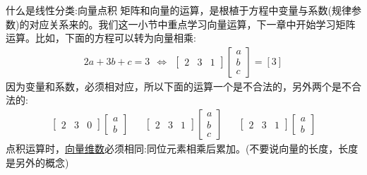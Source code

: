 \documentclass[handout]{ctexbeamer}
\begin{document}
\begin{frame}{什么是线性分类:向量点积}
矩阵和向量的运算，是根植于方程中变量与系数(规律参数)的对应关系来的。我们这一小节中重点学习向量运算，下一章中开始学习矩阵运算。比如，下面的方程可以转为向量相乘:
		\begin{align*}
			2a + 3b + c = 3 \ \ \Leftrightarrow \ \ \begin{bmatrix}
				2 & 3 & 1
			\end{bmatrix} \begin{bmatrix}
				a \\
				b \\
				c
			\end{bmatrix} = [3] 
		\end{align*}
		因为变量和系数，必须相对应，所以下面的运算一个是不合法的，另外两个是不合法的:
		\begin{align*}
			\begin{bmatrix}
				2 & 3 & 0
			\end{bmatrix} \begin{bmatrix}
				a \\
				b 
			\end{bmatrix} & & \begin{bmatrix}
				2 & 3 & 1
			\end{bmatrix} \begin{bmatrix}
				a \\
				b \\
				c
			\end{bmatrix} & & \begin{bmatrix}
				2 & 3 & 1
			\end{bmatrix} \begin{bmatrix}
				a \\
				b 
			\end{bmatrix}
		\end{align*}	
		点积运算时，\underline{向量维数}必须相同:同位元素相乘后累加。(不要说向量的长度，长度是另外的概念)
\end{frame}
\end{document}
